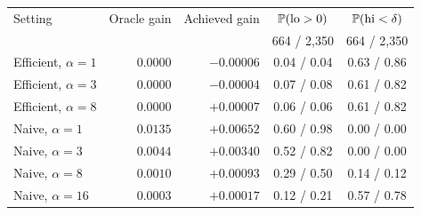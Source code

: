 \begin{tabular}{@{}lrrcc@{}}
\toprule
Setting & Oracle gain & Achieved gain & $\mathbb P(\text{lo}>0)$ & $\mathbb P(\text{hi}<\delta)$ \\
&&& 664 / 2{,}350 & 664 / 2{,}350 \\
\midrule
Efficient, $\alpha=1$ & $0.0000$ & $-0.00006$ & 0.04 / 0.04 & 0.63 / 0.86 \\
Efficient, $\alpha=3$ & $0.0000$ & $-0.00004$ & 0.07 / 0.08 & 0.61 / 0.82 \\
Efficient, $\alpha=8$ & $0.0000$ & $+0.00007$ & 0.06 / 0.06 & 0.61 / 0.82 \\
\addlinespace
Naive, $\alpha=1$ & $0.0135$ & $+0.00652$ & 0.60 / 0.98 & 0.00 / 0.00 \\
Naive, $\alpha=3$ & $0.0044$ & $+0.00340$ & 0.52 / 0.82 & 0.00 / 0.00 \\
Naive, $\alpha=8$ & $0.0010$ & $+0.00093$ & 0.29 / 0.50 & 0.14 / 0.12 \\
Naive, $\alpha=16$ & $0.0003$ & $+0.00017$ & 0.12 / 0.21 & 0.57 / 0.78 \\
\bottomrule
\end{tabular}
